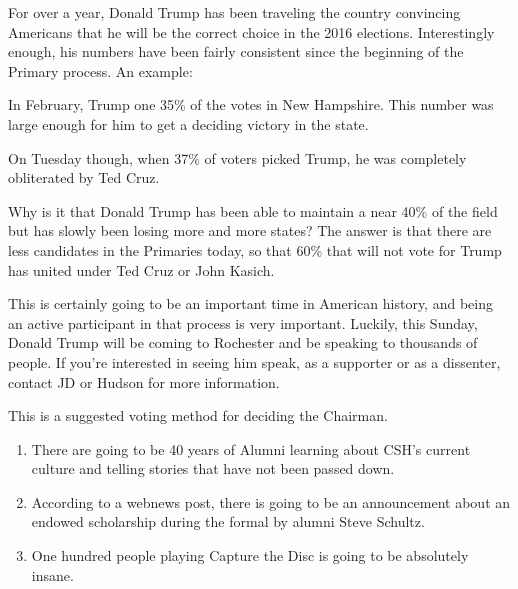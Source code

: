 \documentclass[9pt]{extarticle} %
\begin{document}
\begin{minipage}[t]{.6\linewidth} %
\vspace{.01cm}
\hypertarget{firstnews}{}

For over a year, Donald Trump has been traveling the country convincing Americans that he will be the correct choice in the 2016 elections. Interestingly enough, his numbers have been fairly consistent since the beginning of the Primary process. An example:

In February, Trump one 35\% of the votes in New Hampshire. This number was large enough for him to get a deciding victory in the state.

On Tuesday though, when 37\% of voters picked Trump, he was completely obliterated by Ted Cruz. 

Why is it that Donald Trump has been able to maintain a near 40\% of the field but has slowly been losing more and more states? The answer is that there are less candidates in the Primaries today, so that 60\% that will not vote for Trump has united under Ted Cruz or John Kasich. 

This is certainly going to be an important time in American history, and being an active participant in that process is very important. Luckily, this Sunday, Donald Trump will be coming to Rochester and be speaking to thousands of people. If you're interested in seeing him speak, as a supporter or as a dissenter, contact JD or Hudson for more information. 

\hypertarget{secondnews}{} 

This is a suggested voting method for deciding the Chairman.

\begin{enumerate}

\item There are going to be 40 years of Alumni learning about CSH's current culture and telling stories that have not been passed down. 

\item According to a webnews post, there is going to be an announcement about an endowed scholarship during the formal by alumni Steve Schultz. 

\item One hundred people playing Capture the Disc is going to be absolutely insane. 


\end{enumerate}
\end{minipage}
\end{document}
